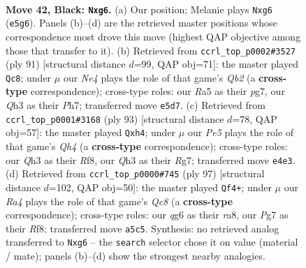 \documentclass[11pt]{article}
\begin{document}
\clearpage

\begin{figure}[p]\centering
\begin{subfigure}{0.46\textwidth}\centering
\resizebox{\linewidth}{!}{%
\newchessgame
\chessboard[
  setfen={2r3k1/6p1/1p4Q1/r2pn3/P3p3/R4N1q/2P2P2/3R2K1 b - - 0 42},
  showmover=false,
  pgfstyle=straightmove, color=movearrow, markmove={e5-g6}
]}
\caption{}
\end{subfigure}\hfill
\begin{subfigure}{0.46\textwidth}\centering
\resizebox{\linewidth}{!}{%
\newchessgame
\chessboard[
  setfen={4r1k1/1q3pPp/8/b1pQ2PP/p2pP3/3R1K2/8/3R4 b - - 4 46},
  showmover=false,
  pgfstyle=straightmove, color=movearrow, markmove={b7-c8}
]}
\caption{}
\end{subfigure}
\\[4pt]
\begin{subfigure}{0.46\textwidth}\centering
\resizebox{\linewidth}{!}{%
\newchessgame
\chessboard[
  setfen={5r1k/6r1/3pQ3/4p1Nq/pP3P1P/P7/5RK1/4R3 b - - 0 47},
  showmover=false,
  pgfstyle=straightmove, color=movearrow, markmove={h5-h4}
]}
\caption{}
\end{subfigure}\hfill
\begin{subfigure}{0.46\textwidth}\centering
\resizebox{\linewidth}{!}{%
\newchessgame
\chessboard[
  setfen={R4rk1/5p2/6p1/Q3p2p/2r1P3/2N5/1PP2KR1/2q5 b - - 21 49},
  showmover=false,
  pgfstyle=straightmove, color=movearrow, markmove={c1-f4}
]}
\caption{}
\end{subfigure}
\caption{\textbf{Move 42, Black: \texttt{Nxg6}.} (a) Our position; Melanie plays \texttt{Nxg6} (\texttt{e5g6}). Panels (b)--(d) are the retrieved master positions whose correspondence most drove this move (highest QAP objective among those that transfer to it). (b) Retrieved from \texttt{ccrl\_top\_p0002\#3527} (ply 91) [structural distance $d$=99, QAP obj=71]: the master played \texttt{Qc8}; under $\mu$ our \emph{Ne4} plays the role of that game's \emph{Qb2} (a \textbf{cross-type} correspondence); cross-type roles: our \emph{R}a5 as their \emph{p}g7, our \emph{Q}h3 as their \emph{P}h7; transferred move \texttt{e5d7}. (c) Retrieved from \texttt{ccrl\_top\_p0001\#3168} (ply 93) [structural distance $d$=78, QAP obj=57]: the master played \texttt{Qxh4}; under $\mu$ our \emph{Pe5} plays the role of that game's \emph{Qh4} (a \textbf{cross-type} correspondence); cross-type roles: our \emph{Q}h3 as their \emph{R}f8, our \emph{Q}h3 as their \emph{R}g7; transferred move \texttt{e4e3}. (d) Retrieved from \texttt{ccrl\_top\_p0000\#745} (ply 97) [structural distance $d$=102, QAP obj=50]: the master played \texttt{Qf4+}; under $\mu$ our \emph{Ra4} plays the role of that game's \emph{Qc8} (a \textbf{cross-type} correspondence); cross-type roles: our \emph{q}g6 as their \emph{r}a8, our \emph{P}g7 as their \emph{R}f8; transferred move \texttt{a5c5}. Synthesis: no retrieved analog transferred to \texttt{Nxg6} -- the \texttt{search} selector chose it on value (material / mate); panels (b)--(d) show the strongest nearby analogies.}
\label{fig:thought-m83}
\end{figure}
\end{document}
